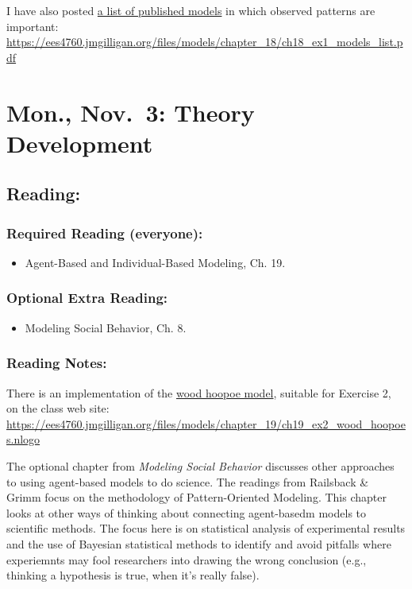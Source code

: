 \documentclass[
]{article}
\providecommand{\tightlist}{%
  \setlength{\itemsep}{0pt}\setlength{\parskip}{0pt}}
\begin{document}
I have also posted
\href{/files/models/chapter_18/ch18_ex1_models_list.pdf}{a list of
published models} in which observed patterns are important:
\url{https://ees4760.jmgilligan.org/files/models/chapter_18/ch18_ex1_models_list.pdf}

\section{Mon., Nov.~3: Theory
Development}\label{mon.-nov.-3-theory-development}

\subsection{Reading:}\label{reading-20}

\subsubsection{Required Reading
(everyone):}\label{required-reading-everyone-17}

\begin{itemize}
\tightlist
\item
  Agent-Based and Individual-Based Modeling, Ch. 19.
\end{itemize}

\subsubsection{Optional Extra Reading:}\label{optional-extra-reading-4}

\begin{itemize}
\tightlist
\item
  Modeling Social Behavior, Ch. 8.
\end{itemize}

\subsubsection{Reading Notes:}\label{reading-notes-15}

There is an implementation of the
\href{/files/models/chapter_19/ch19_ex2_wood_hoopoes.nlogo}{wood hoopoe
model}, suitable for Exercise 2, on the class web site:
\url{https://ees4760.jmgilligan.org/files/models/chapter_19/ch19_ex2_wood_hoopoes.nlogo}

The optional chapter from \emph{Modeling Social Behavior} discusses
other approaches to using agent-based models to do science. The readings
from Railsback \& Grimm focus on the methodology of Pattern-Oriented
Modeling. This chapter looks at other ways of thinking about connecting
agent-basedm models to scientific methods. The focus here is on
statistical analysis of experimental results and the use of Bayesian
statistical methods to identify and avoid pitfalls where experiemnts may
fool researchers into drawing the wrong conclusion (e.g., thinking a
hypothesis is true, when it's really false).
\end{document}
